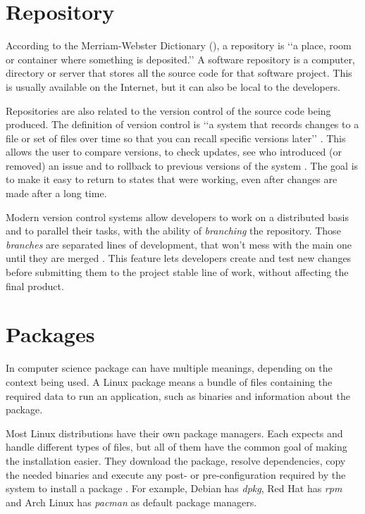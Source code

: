 \section{Repository}
\label {sec:repository}

According to the Merriam-Webster Dictionary (\citeyear{webster2017repository}), a repository is \lq\lq a place, room or container where something is deposited.\rq\rq{} A software repository is a computer, directory or server that stores all the source code for that software project. This is usually available on the Internet, but it can also be local to the developers.

Repositories are also related to the version control of the source code being produced. The definition of version control is \lq\lq a system that records changes to a file or set of files over time so that you can recall specific versions later\rq\rq{} \cite{chacon2014pro}. This allows the user to compare versions, to check updates, see who introduced (or removed) an issue and to rollback to previous versions of the system \cite{chacon2014pro}. The goal is to make it easy to return to states that were working, even after changes are made after a long time.

Modern version control systems allow developers to work on a distributed basis and to parallel their tasks, with the ability of \textit{branching} the repository. Those \textit{branches} are separated lines of development, that won't mess with the main one until they are merged \cite{chacon2014pro}. This feature lets developers create and test new changes before submitting them to the project stable line of work, without affecting the final product.

\section{Packages}
\label {sec:packages}

In computer science package can have multiple meanings, depending on the context being used. A Linux package means a bundle of files containing the required data to run an application, such as binaries and information about the package.

Most Linux distributions have their own package managers. Each expects and handle different types of files, but all of them have the common goal of making the installation easier. They download the package, resolve dependencies, copy the needed binaries and execute any post- or pre-configuration required by the system to install a package \cite{linode2017linux}. For example, Debian has \textit{dpkg}, Red Hat has \textit{rpm} and Arch Linux has \textit{pacman} as default package managers.

